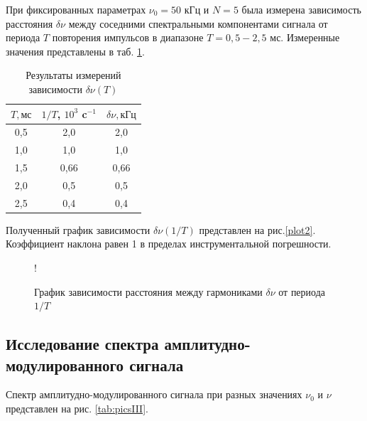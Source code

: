 \documentclass[a4paper,12pt]{article} %
\begin{document}
При фиксированных параметрах $\nu_0 = 50$ кГц и $N = 5$ была измерена зависимость расстояния $\delta\nu$ между соседними спектральными компонентами сигнала от периода $T$ повторения импульсов в диапазоне $T = 0,5 - 2,5$ мс. Измеренные значения представлены в таб. \ref{tab:resultsII}.

\begin{table}[h!]
\begin{center}
\begin{tabular}{|c|c|c|}
\hline
$T, мс$ & $1/T$, $10^3$ c$^{-1}$ & $\delta\nu, кГц$ \\ \hline
0,5 & 2,0 & 2,0 \\ \hline
1,0 & 1,0 & 1,0 \\ \hline
1,5 & 0,66 & 0,66 \\ \hline
2,0 & 0,5 & 0,5 \\ \hline
2,5 & 0,4 & 0,4 \\ \hline
\end{tabular}
\end{center}
\caption{Результаты измерений зависимости $\delta\nu(T)$}
\label{tab:resultsII}
\end{table}

Полученный график зависимости $\delta{\nu}(1/T)$ представлен на рис.\ref{plot2}. Коэффициент наклона равен 1 в пределах инструментальной погрешности.

\begin{figure}[h!]
\centering
{} {!} {
}
\caption{График зависимости расстояния между гармониками $\delta{\nu}$ от периода $1/T$}
\label{plotII}
\end{figure}

\subsection{Исследование спектра амплитудно-модулированного сигнала}

Спектр амплитудно-модулированного сигнала при разных значениях $\nu_0$ и $\nu$ представлен на рис. \ref{tab:picsIII}.
\end{document}
